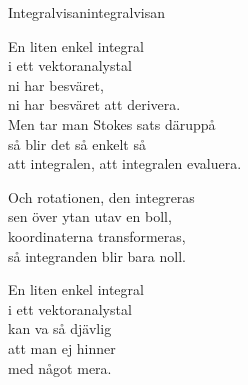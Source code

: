 \begin{song}{Integralvisan}{integralvisan}
\begin{vers}
En liten enkel integral\\
i ett vektoranalystal\\
ni har besväret,\\
ni har besväret att derivera.\\
Men tar man Stokes sats däruppå\\
så blir det så enkelt så\\
att integralen, att integralen evaluera.\\
\end{vers}
\begin{vers}
Och rotationen, den integreras\\
sen över ytan utav en boll,\\
koordinaterna transformeras,\\
så integranden blir bara noll.\\
\end{vers}
\begin{vers}
En liten enkel integral\\
i ett vektoranalystal \\
kan va så djävlig\\
att man ej hinner\\
med något mera.\\
\end{vers}
\end{song}
